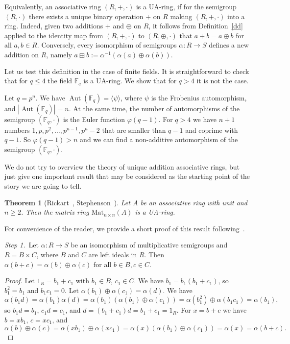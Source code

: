 \documentclass[a4paper,draft,reqno,12pt]{amsart}
\newtheorem{theorem}{Theorem}
\theoremstyle{definition}
\theoremstyle{remark}
\DeclareMathOperator{\Aut}{Aut}
\def\FF{{\mathbb F}}
\renewcommand{\ge}{\geqslant}
\renewcommand{\le}{\leqslant}
\begin{document}
\smallskip

Equivalently, an associative ring $(R,+,\cdot)$ is a UA-ring, if for the semigroup $(R,\cdot)$ there exists a unique binary operation $+$ on $R$ making $(R,+,\cdot)$ into a ring. Indeed, given two additions $+$ and $\oplus$ on $R$, it follows from Definition~\ref{dd} applied to the identity map from $(R,+,\cdot)$ to $(R,\oplus,\cdot)$ that $a+b=a\oplus b$ for all $a,b \in R$. Conversely, every isomorphism of semigroups $\alpha\colon R\to S$ defines a new addition on $R$, namely $a\boxplus b:=\alpha^{-1}(\alpha(a)\oplus\alpha(b)).$

\smallskip

Let us test this definition in the case of finite fields. It is straightforward to check that for $q\le 4$ the field $\FF_q$ is a UA-ring. We show that for $q>4$ it is not the case.

Let $q=p^n$. We have $\Aut(\mathbb{F}_q)=\langle \psi\rangle$, where $\psi$ is the Frobenius automorphism, and $|\Aut(\mathbb{F}_q)|=n$. At the same time, the number of automorphisms of the semigroup $(\mathbb{F}_q, \cdot)$ is the Euler function $\varphi(q-1)$. For $q>4$ we have $n+1$ numbers $1,p,p^2,\ldots,p^{n-1},p^n-2$
that are smaller than $q-1$ and coprime with $q-1$. So $\varphi(q-1)>n$ and we can find a non-additive automorphism of the semigroup $(\mathbb{F}_q, \cdot)$.

\smallskip 

We do not try to overview the theory of unique addition associative rings, but just give one important result that may be considered as the starting point of the story we are going to tell. 

\begin{theorem} [Rickart~\cite{Ri}, Stephenson~\cite{St}] 
\label{RS}
Let $A$ be an associative ring with unit and~${n\ge 2}$. Then the matrix ring $\text{Mat}_{n\times n}(A)$ is a UA-ring.
\end{theorem}  

For convenience of the reader, we provide a short proof of this result following~\cite{St}. 

\smallskip

{\it Step 1.}\ Let $\alpha\colon R\to S$ be an isomorphism of multiplicative semigroups and $R=B\times C$, where $B$ and $C$ are left ideals in $R$. Then $\alpha(b+c)=\alpha(b)\oplus\alpha(c)$ for all $b\in B, c\in C$.

\begin{proof} 
Let $1_R=b_1+c_1$ with $b_1\in B$, $c_1\in C$. We have $b_1=b_1(b_1+c_1)$, so $b_1^2=b_1$ and $b_1c_1=0$. Let $\alpha(b_1)\oplus\alpha(c_1)=\alpha(d)$. We have 
$$\alpha(b_1d)=\alpha(b_1)\alpha(d)=\alpha(b_1)(\alpha(b_1)\oplus\alpha(c_1))=\alpha(b_1^2)\oplus\alpha(b_1c_1)=\alpha(b_1), 
$$
so $b_1d=b_1$, $c_1d=c_1$, and $d=(b_1+c_1)d=b_1+c_1=1_R$. For $x=b+c$ we have $b=xb_1$, $c=xc_1$, and
$$
\alpha(b)\oplus\alpha(c)=\alpha(xb_1)\oplus\alpha(xc_1)=\alpha(x)(\alpha(b_1)\oplus\alpha(c_1))=\alpha(x)=\alpha(b+c).
$$
\end{proof}
 
\end{document}
